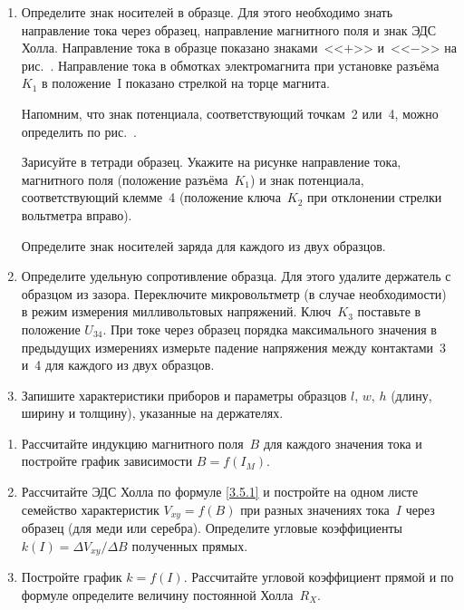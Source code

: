 \begin{lab:task}
\begin{enumerate}
{При максимальном токе через образец проведите измерения $U=f(I_{M})$ при другом
направлении магнитного поля.

Для образца из цинка снимите зависимость $U=f(I_{M})$ при одном значении тока
через образец.}

\item{Определите знак носителей в образце. Для этого необходимо знать
направление тока через образец, направление магнитного поля и знак ЭДС Холла.
Направление тока в образце показано знаками~<<$+$>> и~<<$-$>> на
рис.~. Направление тока в обмотках электромагнита при установке
разъёма~$K_1$ в положение~I показано стрелкой на торце магнита.

Напомним, что знак потенциала, соответствующий точкам~2 или~4, можно определить
по рис.~.

Зарисуйте в тетради образец. Укажите на рисунке направление тока, магнитного
поля (положение разъёма~$K_1$) и знак
потенциала, соответствующий клемме~4 (положение ключа~$K_2$ при отклонении
стрелки вольтметра вправо).

Определите знак носителей заряда для каждого из двух образцов.}
\item{Определите удельную сопротивление образца. Для этого удалите держатель с
образцом из зазора. Переключите микровольтметр (в случае необходимости) в режим
измерения милливольтовых напряжений. Ключ~$K_3$ поставьте в положение $U_{34}$.
При токе через образец порядка максимального значения в предыдущих измерениях
измерьте падение напряжения между контактами~3 и~4 для каждого из двух
образцов.}

\item{ Запишите характеристики приборов и параметры образцов $l$, $w$, $h$
(длину, ширину и толщину), указанные на держателях.}
\end{enumerate}

\begin{enumerate}
\item{Рассчитайте индукцию магнитного поля~$B$ для каждого значения тока и
постройте график зависимости $B=f(I_{M})$.}

\item{Рассчитайте ЭДС Холла по формуле \eqref{3.5.1} и постройте на одном листе
семейство характеристик $V_{xy}=f(B)$ при разных значениях тока~$I$ через
образец (для меди или серебра). Определите угловые коэффициенты $k(I)=\Delta
V_{xy}/\Delta B$ полученных прямых.}

\item{ Постройте график $k=f(I)$. Рассчитайте угловой коэффициент прямой и по
формуле  определите величину постоянной Холла~$R_X$.

}
\end{enumerate}
\end{lab:task}
